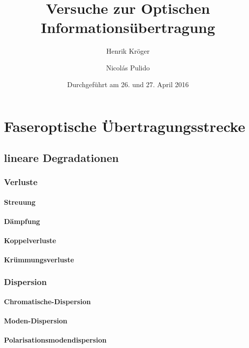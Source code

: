 \documentclass[a4paper]{article}
\title{Versuche zur Optischen Informationsübertragung}
\author{Henrik Kröger \and Nicol\'as Pulido}
\date{Durchgeführt am 26. und 27. April 2016}
\begin{document}


\maketitle


\tableofcontents

\newpage
\section{Faseroptische Übertragungsstrecke}

\subsection{lineare Degradationen}

\subsubsection{Verluste}
\paragraph{Streuung}
\paragraph{Dämpfung}
\paragraph{Koppelverluste}
\paragraph{Krümmungsverluste}

\subsubsection{Dispersion}
\paragraph{Chromatische-Dispersion}
\paragraph{Moden-Dispersion}
\paragraph{Polarisationsmodendispersion}
\end{document}
